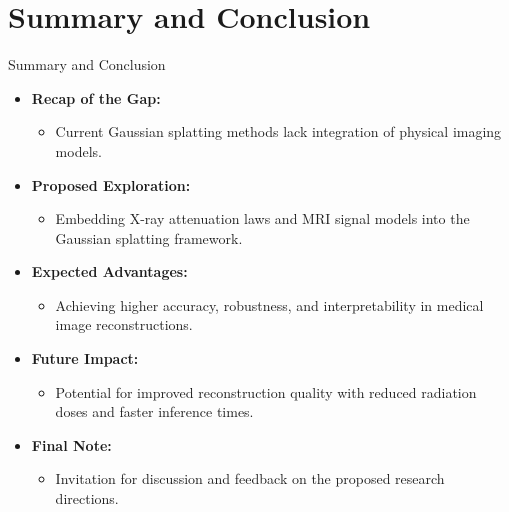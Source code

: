 \documentclass{beamer}
\begin{document}
\section{Summary and Conclusion}
\begin{frame}{Summary and Conclusion}
    \begin{itemize}
        \item \textbf{Recap of the Gap:}
        \begin{itemize}
            \item Current Gaussian splatting methods lack integration of physical imaging models.
        \end{itemize}
        \item \textbf{Proposed Exploration:}
        \begin{itemize}
            \item Embedding X-ray attenuation laws and MRI signal models into the Gaussian splatting framework.
        \end{itemize}
        \item \textbf{Expected Advantages:}
        \begin{itemize}
            \item Achieving higher accuracy, robustness, and interpretability in medical image reconstructions.
        \end{itemize}
        \item \textbf{Future Impact:}
        \begin{itemize}
            \item Potential for improved reconstruction quality with reduced radiation doses and faster inference times.
        \end{itemize}
        \item \textbf{Final Note:}
        \begin{itemize}
            \item Invitation for discussion and feedback on the proposed research directions.
        \end{itemize}
    \end{itemize}
\end{frame}
\end{document}
